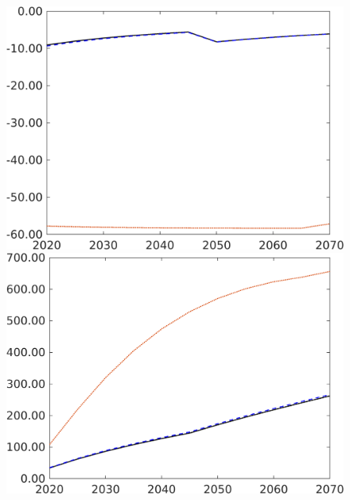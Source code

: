 \begin{figure}[h!!!]
\begin{minipage}[]{0.32\textwidth}
\end{minipage}
\begin{minipage}[]{0.32\textwidth}
\includegraphics[width=1\textwidth]{../../codding_model/own_basedOnFried/optimalPol_190722_tidiedUp/figures/all_10Aout22/snS_PercentageLfDynNT_Target_regime3_spillover0_noskill0_sep1_xgrowth0_PV1_etaa0.79_lgd0.png}
\end{minipage}
\begin{minipage}[]{0.32\textwidth}
	\includegraphics[width=1\textwidth]{../../codding_model/own_basedOnFried/optimalPol_190722_tidiedUp/figures/all_10Aout22/AgAf_PercentageLfDynNT_Target_regime3_spillover0_noskill0_sep1_xgrowth0_PV1_etaa0.79_lgd0.png}

\end{minipage}
\end{figure}
